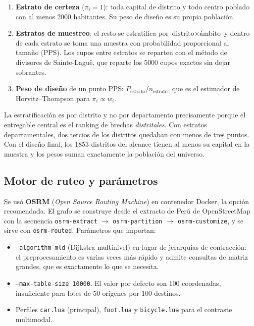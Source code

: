 \documentclass[10pt,a4paper]{article}
\begin{document}
\begin{enumerate}
\item \textbf{Estrato de certeza} ($\pi_i = 1$): toda capital de distrito y todo
centro poblado con al menos \num{2000} habitantes. Su peso de diseño es su
propia población.
\item \textbf{Estratos de muestreo}: el resto se estratifica por
$\text{distrito} \times \text{ámbito}$ y dentro de cada estrato se toma una
muestra con probabilidad proporcional al tamaño (PPS). Los cupos entre estratos
se reparten con el método de divisores de Sainte-Laguë, que reparte los
\num{5000} cupos exactos sin dejar sobrantes.
\item \textbf{Peso de diseño} de un punto PPS: $P_{\text{estrato}} / n_{\text{estrato}}$,
que es el estimador de Horvitz--Thompson para $\pi_i \propto w_i$.
\end{enumerate}

La estratificación es por distrito y no por departamento precisamente porque el
entregable central es el ranking de brechas \emph{distritales}. Con estratos
departamentales, dos tercios de los distritos quedaban con menos de tres puntos.
Con el diseño final, los \num{1853} distritos del alcance tienen al menos su
capital en la muestra y los pesos suman exactamente la población del universo.

\subsection{Motor de ruteo y parámetros}

Se usó \textbf{OSRM} (\emph{Open Source Routing Machine}) en contenedor Docker,
la opción recomendada. El grafo se construye desde el extracto de Perú de
OpenStreetMap con la secuencia \texttt{osrm-extract} $\to$
\texttt{osrm-partition} $\to$ \texttt{osrm-customize}, y se sirve con
\texttt{osrm-routed}. Parámetros que importan:

\begin{itemize}
\item \texttt{--algorithm mld} (Dijkstra multinivel) en lugar de jerarquías de
contracción: el preprocesamiento es varias veces más rápido y admite consultas
de matriz grandes, que es exactamente lo que se necesita.
\item \texttt{--max-table-size 10000}. El valor por defecto son \num{100}
coordenadas, insuficiente para lotes de \num{50} orígenes por \num{100} destinos.
\item Perfiles \texttt{car.lua} (principal), \texttt{foot.lua} y
\texttt{bicycle.lua} para el contraste multimodal.
\end{itemize}
\end{document}

